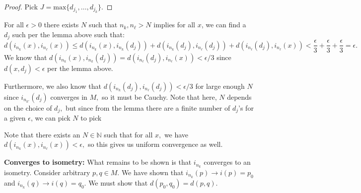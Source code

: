 \documentclass{article}
\numberwithin{equation}{section}
\begin{document}
\begin{enumerate}
\begin{enumerate}[label=(\alph*)]
\begin{lemma}
\begin{proof}
                Pick $J = \text{max}\{d_{j_1},\dots , d_{j_k}\}.$
            \end{proof}
        \end{lemma}
            
        For all $\epsilon > 0$ there exists $N$ such that $n_k,n_\ell > N$ implies for all $x$, we can find a $d_j$ such per the lemma above such that:
        \begin{equation}
            d(i_{n_{k}}(x), i_{n_{\ell}}(x)) \le d(i_{n_{k}}(x), i_{n_{k}}(d_j)) + d(i_{n_{k}}(d_j), i_{n_{\ell}}(d_j)) + d(i_{n_{\ell}}(d_j), i_{n_{\ell}}(x)) < \frac{\epsilon}{3} + \frac{\epsilon}{3} + \frac{\epsilon}{3} = \epsilon.
        \end{equation}
        We know that $d(i_{n_{k}}(x), i_{n_{k}}(d_j)) = d(i_{n_{\ell}}(d_j), i_{n_{\ell}}(x))< \epsilon/3$ since $d(x,d_j)<\epsilon$ per the lemma above.
        
        Furthermore, we also know that $d(i_{n_{k}}(d_j), i_{n_{\ell}}(d_j)) < \epsilon/3$ for large enough $N$ since $i_{n_{k'}}(d_j)$ converges in $M,$ so it must be Cauchy. Note that here, $N$ depends on the choice of $d_j,$ but since from the lemma there are a finite number of $d_j$'s for a given $\epsilon$, we can pick $N$ to pick  

        Note that there exists an $N\in \mathbb{N}$ such that for all $x,$ we have $d(i_{n_{k}}(x), i_{n_{\ell}}(x)) < \epsilon,$ so this gives us uniform convergence as well.

        \textbf{Converges to isometry:} What remains to be shown is that $i_{n_{k}}$ converges to an isometry. Consider arbitrary $p,q\in M.$ We have shown that $i_{n_{k}}(p) \to i(p) = p_0$ and $i_{n_{k}}(q) \to i(q) = q_0.$ We must show that $d(p_0,q_0) = d(p,q).$


\end{enumerate}
\end{enumerate}
\end{document}
